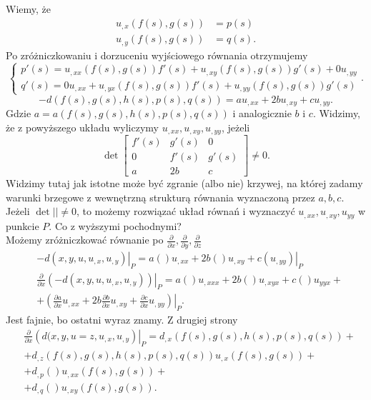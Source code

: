 \documentclass[../main.tex]{subfiles}
\begin{document}
Wiemy, że
\begin{align*}
		u_{,x}(f(s),g(s)) &= p(s)\\
		u_{,y}(f(s),g(s)) &= q(s)
.\end{align*}
Po zróżniczkowaniu i dorzuceniu wyjściowego równania otrzymujemy
\[
\begin{cases}
		p'(s) = u_{,x x}(f(s),g(s))f'(s) + u_{,xy}(f(s),g(s))g'(s) + 0u_{,yy}\\
		q'(s) = 0u_{,x x} + u_{,yx}(f(s),g(s))f'(s) + u_{,yy}(f(s),g(s))g'(s)
\end{cases}
.\]
\[
		-d(f(s),g(s),h(s),p(s),q(s)) = a u_{,x x} + 2b u_{,x y} + cu_{,yy}
.\]
Gdzie $a = a(f(s),g(s),h(s),p(s),q(s))$ i analogicznie $b$ i $c$. Widzimy, że z powyższego układu wyliczymy $u_{,x x},u_{,xy},u_{,yy}$, jeżeli
\[
		\det \begin{bmatrix} f'(s)&g'(s)&0\\0&f'(s)&g'(s)\\a&2b&c \end{bmatrix} \neq 0
.\]
Widzimy tutaj jak istotne może być zgranie (albo nie) krzywej, na której zadamy warunki brzegowe z wewnętrzną strukturą równania wyznaczoną przez $a,b,c$.\\
Jeżeli $\det | | \neq 0$, to możemy rozwiązać układ równań i wyznaczyć $u_{,x x}, u_{,xy}, u_{yy}$ w punkcie $P$. Co z wyższymi pochodnymi?\\
Możemy zróżniczkować równanie po $\frac{\partial }{\partial x}, \frac{\partial }{\partial y}, \frac{\partial }{\partial z} $
\begin{align*}
		&-\left.d(x,y,u,u_{,x},u_{,y})\right|_P = \left.a\left(  \right) u_{,x x} + 2b\left(  \right) u_{,xy} + c\left( u_{,yy} \right)\right|_P\\
		&\left.\frac{\partial }{\partial x} \left( -d(x,y,u,u_{,x},u_{,y}) \right) \right|_P = a\left(  \right) u_{,x x x} + 2b\left(  \right) u_{,xyx} + c\left(  \right) u_{yyx} +\\
		&+ \left.\left( \frac{\partial a}{\partial x} u_{,x x}+ 2b \frac{\partial b}{\partial x} u_{,xy} + \frac{\partial c}{\partial x} u_{,yy} \right) \right|_P
.\end{align*}
Jest fajnie, bo ostatni wyraz znamy. Z drugiej strony
\begin{align*}
		&\frac{\partial }{\partial x} \left. \left( d(x,y,u=z,u_{,x},u_{,y} \right) \right|_P = d_{,x}(f(s),g(s),h(s),p(s),q(s)) + \\
		&+ d_{,z}(f(s),g(s),h(s),p(s),q(s)) u_{,x}(f(s),g(s)) + \\
		&+d_{,p}\left(  \right) u_{,x x}(f(s),g(s)) + \\
		&+ d_{,q}\left(  \right) u_{,xy}(f(s),g(s))
.\end{align*}
\end{document}
